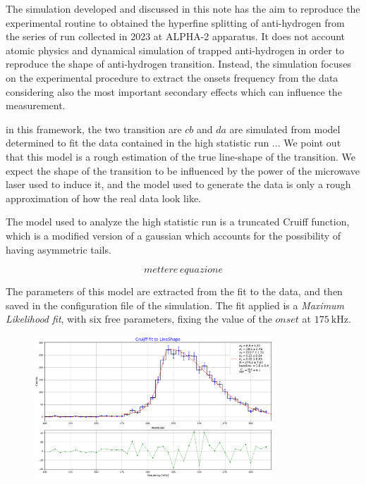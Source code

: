 \documentclass[11pt,a4paper,oneside]{article}
\begin{document}
The simulation developed and discussed in this note has the aim to reproduce the experimental routine to obtained the hyperfine splitting of anti-hydrogen from the series of run collected in 2023 at ALPHA-2 apparatus. It does not account atomic physics and dynamical simulation of trapped anti-hydrogen in order to reproduce the shape of anti-hydrogen transition. Instead, the simulation focuses on the experimental procedure to extract the onsets frequency from the data considering also the most important secondary effects which can influence the measurement.

in this framework, the two transition are $cb$ and $da$ are simulated from model determined to fit the data contained in the high statistic run ... 
We point out that this model is a rough estimation of the true line-shape of the transition. We expect the shape of the transition to be influenced by the power of the microwave laser used to induce it, and the model used to generate the data is only a rough approximation of how the real data look like.

The model used to analyze the high statistic run is a truncated Cruiff function, which is a modified version of a gaussian which accounts for the possibility of having asymmetric tails.

\begin{equation} \label{eq:Cruiff}
mettere \, equazione
\end{equation} 

The parameters of this model are extracted from the fit to the data, and then saved in the configuration file of the simulation. The fit applied is a \textit{Maximum Likelihood fit}, with six free parameters, fixing the value of the $onset$ at $\SI{175}{ \kilo \hertz}$.

\begin{figure}[hbtp]
\centering
\includegraphics[width=0.8\textwidth]{TruncatedLineShape.pdf}
\end{figure}
\end{document}
